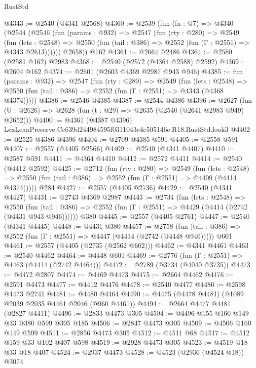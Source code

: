 \begin{lexlean}{RustStd}
\begin{coremodule}
@4343 := @2540 (@4341 @2568)
@4360 := @2539
    (fun (fn : @7) =>
    @4340
      (@2544
        (@2546
          (fun (params : @932) =>
          @2547
            (fun (rty : @280) =>
            @2549
              (fun (lets : @2548) =>
              @2550 (fun (tail : @386) => @2552 (fun (Γ : @2551) => @4343 @2613))))))
        @2658))
    @162
@4361 := @2664 @2486
@4364 := @2580 (@2581 @162) @2983
@4368 := @2540 (@2572 (@4364 @2588) @2592)
@4369 := @2604 @162
@4374 := @2601 (@2603 @4369 @2987 @943 @946)
@4385 := fun (params : @932) =>
  @2547
    (fun (rty : @280) =>
    @2549
      (fun (lets : @2548) =>
      @2550 (fun (tail : @386) => @2552 (fun (Γ : @2551) => @4343 (@4368 @4374)))))
@4386 := @2546 @4385
@4387 := @2544 @4386
@4396 := @2627 (fun (U : @2626) => @2628 (fun (t : @29) => @2635 (@2540 (@2641 @2983 @949) @2652)))
@4400 := @4361 (@4387 @4396) LexLeanPreserve.Cc639d244984595f0311043c4c505146e.R18.RustStd.look3
@4402 := @2525 @4386 @4396
@4404 := @2709 @4385 @591
@4405 := @2558 @591
@4407 := @2557 (@4405 @2566)
@4409 := @2540 (@4341 @4407)
@4410 := @2587 @591
@4411 := @4364 @4410
@4412 := @2572 @4411
@4414 := @2540 (@4412 @2592)
@4425 := @2712
    (fun (rty : @280) =>
    @2549
      (fun (lets : @2548) =>
      @2550 (fun (tail : @386) => @2552 (fun (Γ : @2551) => @4409 (@4414 @4374)))))
    @284
@4427 := @2557 (@4405 @2736)
@4429 := @2540 (@4341 @4427)
@4431 := @2743 @4369 @2987
@4443 := @2734
    (fun (lets : @2548) =>
    @2550 (fun (tail : @386) => @2552 (fun (Γ : @2551) => @4429 (@4414 (@2742 (@4431 @943 @946))))))
    @380
@4445 := @2557 (@4405 @2761)
@4447 := @2540 (@4341 @4445)
@4448 := @4431 @380
@4457 := @2758
    (fun (tail : @386) => @2552 (fun (Γ : @2551) => @4447 (@4414 (@2742 (@4448 @946)))))
    @601
@4461 := @2557 (@4405 (@2735 (@2562 @602)))
@4462 := @4341 @4461
@4463 := @2540 @4462
@4464 := @4448 @601
@4469 := @2776 (fun (Γ : @2551) => @4463 (@4414 (@2742 @4464)))
@4472 := @2789 (@3734 (@4040 @3735))
@4473 := @4472 @2807
@4474 := @4469 @4473
@4475 := @2664 @4462
@4476 := @2591 @4473
@4477 := @4412 @4476
@4478 := @2540 @4477
@4480 := @2598 @4473 @2741
@4481 := @4480 @4464
@4490 := @4475 (@4478 @4481) (@1089 @2039 @2035 @4461 @2046 (@960 @4461))
@4494 := @2664 @4477 @4481 (@2827 @4411)
@4496 := @2833 @4473 @305
@4504 := @4496 @155 @160 @149 @33 @380 @599 @305 @185
@4506 := @2847 @4473 @305
@4509 := @4506 @160 @149 @599
@4511 := @2856 @4473 @305
@4512 := @4511 @68
@4517 := @4512 @159 @33 @102 @407 @598
@4519 := @2928 @4473 @305
@4523 := @4519 @18 @33 @18 @407
@4524 := @2937 @4473
@4528 := @4523 (@2936 (@4524 @18)) @3074

\end{coremodule}
\end{lexlean}
